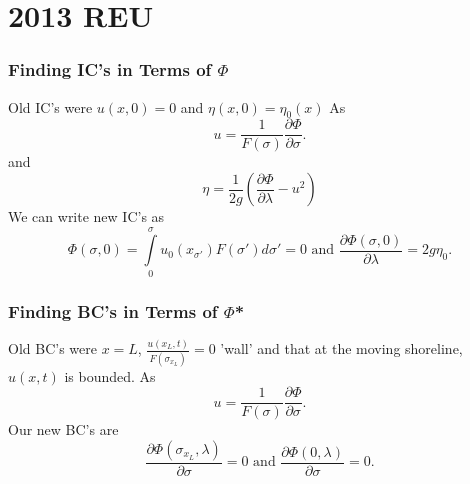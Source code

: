 \section{2013 REU}



\begin{frame}
\frametitle{Finding IC's in Terms of $\Phi$}
Old IC's were $u(x,0) = 0$ and $\eta(x,0) = \eta_0(x)$
As
\[
u = \frac{1}{F(\sigma)} \frac{\partial \Phi}{\partial \sigma}.
\]
and
\[
\eta =  \frac{1}{2g} \left(\frac{\partial \Phi}{\partial \lambda} - u^2 \right)
\]
We can write new IC's as
\[
\Phi(\sigma,0) = \int\limits_0^\sigma u_0(x_{\sigma'})F(\sigma')d\sigma'=0 \text{ and } \frac{\partial \Phi(\sigma,0)}{\partial \lambda} = 2g\eta_0.
\]
\end{frame}


\begin{frame}
\frametitle{Finding BC's in Terms of $\Phi$*}
Old BC's were $x=L$, $\frac{u(x_L,t)}{F(\sigma_{x_L})}=0$ 'wall' and that at the moving shoreline, $u(x,t)$ is bounded. As 
\[
u = \frac{1}{F(\sigma)} \frac{\partial \Phi}{\partial \sigma}.
\]
Our new BC's are
\[
\frac{\partial \Phi(\sigma_{x_L},\lambda)}{\partial \sigma} = 0 \text{ and } \frac{\partial \Phi(0,\lambda)}{\partial \sigma} = 0.
\]
\end{frame}







